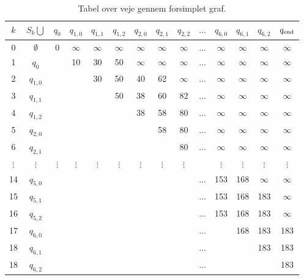 \begin{table}[H]
\centering
\begin{tabular}{|c|c|c|c|c|c|c|c|c|c|c|c|c|c|} 
\hline
$k$ & $S_{k} \bigcup$ & $q_{0}$ & $q_{1,0}$ & $q_{1,1}$ & $q_{1,2}$ & $q_{2,0}$ & $q_{2,1}$ & $q_{2,2}$ & $\ldots$ & $q_{6,0}$ & $q_{6,1}$ & $q_{6,2}$ & $q_{\textrm{end}}$ \\
\hline
0 & $\emptyset$ & 0 & $\infty$ & $\infty$ & $\infty$ & $\infty$ & $\infty$ & $\infty$ & $\ldots$ & $\infty$ & $\infty$ & $\infty$ & $\infty$ \\ 
1 & $q_{0}$ & & 10 & 30 & 50 & $\infty$ & $\infty$ & $\infty$ & $\ldots$ & $\infty$ & $\infty$ & $\infty$ & $\infty$\\ 
2 & $q_{1,0}$ & & & 30 & 50 & 40 & 62 & $\infty$ & $\ldots$ & $\infty$ & $\infty$ & $\infty$ & $\infty$\\ 
3 & $q_{1,1}$ & & & & 50 & 38 & 60 & 82 & $\ldots$ & $\infty$ & $\infty$ & $\infty$ & $\infty$\\
4 & $q_{1,2}$ & & & & & 38 & 58 & 80 & $\ldots$ & $\infty$ & $\infty$ & $\infty$ & $\infty$\\ 
5 & $q_{2,0}$ & & & & & & 58 & 80 & $\ldots$ & $\infty$ & $\infty$ & $\infty$ & $\infty$\\ 
6 & $q_{2,1}$ & & & & & & & 80 & $\ldots$ & $\infty$ & $\infty$ & $\infty$ & $\infty$\\  
$\vdots$ & $\vdots$ & $\vdots$ & $\vdots$ & $\vdots$ & $\vdots$ & $\vdots$ & $\vdots$ & $\vdots$ &  & $\vdots$ & $\vdots$ & $\vdots$ & $\vdots$\\ 
14 & $q_{5,0}$ &  &  &  &  &  &  &  & $\ldots$ & 153 & 168 & $\infty$ & $\infty$\\ 
15 & $q_{5,1}$ &  &  &  &  &  &  &  & $\ldots$ & 153 & 168 & 183 & $\infty$\\ 
16 & $q_{5,2}$ &  &  &  &  &  &  &  & $\ldots$ & 153 & 168 & 183 & $\infty$\\ 
17 & $q_{6,0}$ &  &  &  &  &  &  &  & $\ldots$ &  & 168 & 183 & 183\\ 
18 & $q_{6,1}$ &  &  &  &  &  &  &  & $\ldots$ &  &  & 183 & 183\\ 
18 & $q_{6,2}$ &  &  &  &  &  &  &  & $\ldots$ &  &  &  & 183\\ 
\hline
\end{tabular}
\caption{Tabel over veje gennem forsimplet graf.}
\label{table:forsimplet_graf}
\end{table}